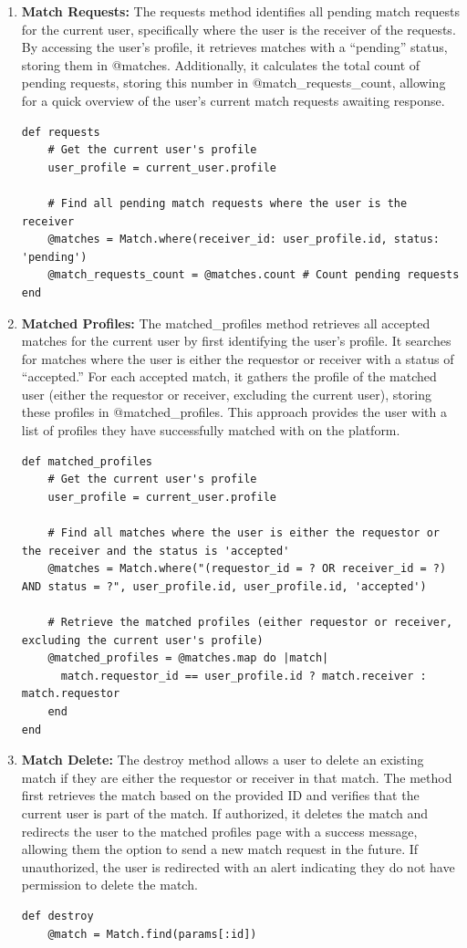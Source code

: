 \begin{enumerate}
    \newpage
    \item \textbf{Match Requests:} 
    The requests method identifies all pending match requests for the current user, specifically where the user is the receiver of the requests. By accessing the user’s profile, it retrieves matches with a “pending” status, storing them in @matches. Additionally, it calculates the total count of pending requests, storing this number in @match\_requests\_count, allowing for a quick overview of the user’s current match requests awaiting response.
    \begin{lstlisting}
def requests
    # Get the current user's profile
    user_profile = current_user.profile

    # Find all pending match requests where the user is the receiver
    @matches = Match.where(receiver_id: user_profile.id, status: 'pending')
    @match_requests_count = @matches.count # Count pending requests
end
    \end{lstlisting}

    \newpage
    \item \textbf{Matched Profiles:} 
    The matched\_profiles method retrieves all accepted matches for the current user by first identifying the user’s profile. It searches for matches where the user is either the requestor or receiver with a status of “accepted.” For each accepted match, it gathers the profile of the matched user (either the requestor or receiver, excluding the current user), storing these profiles in @matched\_profiles. This approach provides the user with a list of profiles they have successfully matched with on the platform.
    \begin{lstlisting}
def matched_profiles
    # Get the current user's profile
    user_profile = current_user.profile

    # Find all matches where the user is either the requestor or the receiver and the status is 'accepted'
    @matches = Match.where("(requestor_id = ? OR receiver_id = ?) AND status = ?", user_profile.id, user_profile.id, 'accepted')

    # Retrieve the matched profiles (either requestor or receiver, excluding the current user's profile)
    @matched_profiles = @matches.map do |match|
      match.requestor_id == user_profile.id ? match.receiver : match.requestor
    end
end
    \end{lstlisting}

    \newpage
    \item \textbf{Match Delete:} 
    The destroy method allows a user to delete an existing match if they are either the requestor or receiver in that match. The method first retrieves the match based on the provided ID and verifies that the current user is part of the match. If authorized, it deletes the match and redirects the user to the matched profiles page with a success message, allowing them the option to send a new match request in the future. If unauthorized, the user is redirected with an alert indicating they do not have permission to delete the match.
    \begin{lstlisting}
def destroy
    @match = Match.find(params[:id])


\end{lstlisting}
\end{enumerate}
